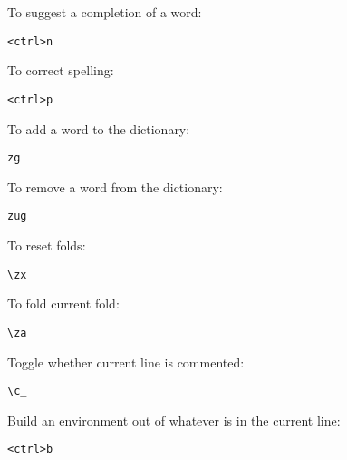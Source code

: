 \documentclass{amsart}
\begin{document}
To suggest a completion of a word:
\begin{verbatim}
<ctrl>n
\end{verbatim}

To correct spelling:
\begin{verbatim}
<ctrl>p
\end{verbatim}

To add a word to the dictionary:
\begin{verbatim}
zg
\end{verbatim}

To remove a word from the dictionary:
\begin{verbatim}
zug
\end{verbatim}

To reset folds:
\begin{verbatim}
\zx 
\end{verbatim}

To fold current fold:
\begin{verbatim}
\za
\end{verbatim}

Toggle whether current line is commented:
\begin{verbatim}
\c_
\end{verbatim}

Build an environment out of whatever is in the current line:
\begin{verbatim}
<ctrl>b
\end{verbatim}
\end{document}
